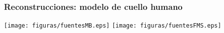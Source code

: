 \begin{frame}
\begin{columns}[t]
\end{columns} 


\end{frame}


\begin{frame}
\frametitle{Reconstrucciones: modelo de cuello humano}
\centering
    \vspace{0.1cm}
  \texttt{[image: figuras/fuentesMB.eps]}
  \texttt{[image: figuras/fuentesFMS.eps]}
\end{frame}




